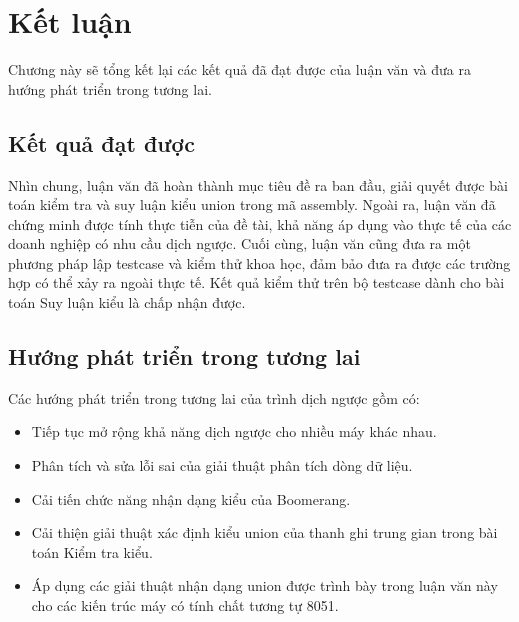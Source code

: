 \chapter{Kết luận}

Chương này sẽ tổng kết lại các kết quả đã đạt được của luận văn và đưa ra hướng phát triển trong tương lai.

\section{Kết quả đạt được}

Nhìn chung, luận văn đã hoàn thành mục tiêu đề ra ban đầu, giải quyết được bài toán kiểm tra và suy luận kiểu union trong mã assembly. Ngoài ra, luận văn đã chứng minh được tính thực tiễn của đề tài, khả năng áp dụng vào thực tế của các doanh nghiệp có nhu cầu dịch ngược. Cuối cùng, luận văn cũng đưa ra một phương pháp lập testcase và kiểm thử khoa học, đảm bảo đưa ra được các trường hợp có thể xảy ra ngoài thực tế. Kết quả kiểm thử trên bộ testcase dành cho bài toán Suy luận kiểu là chấp nhận được.

\section{Hướng phát triển trong tương lai}

Các hướng phát triển trong tương lai của trình dịch ngược gồm có:

\begin{itemize}
	\item Tiếp tục mở rộng khả năng dịch ngược cho nhiều máy khác nhau.
	\item Phân tích và sửa lỗi sai của giải thuật phân tích dòng dữ liệu.
	\item Cải tiến chức năng nhận dạng kiểu của Boomerang.
	\item Cải thiện giải thuật xác định kiểu union của thanh ghi trung gian trong bài toán Kiểm tra kiểu.
	\item Áp dụng các giải thuật nhận dạng union được trình bày trong luận văn này cho các kiến trúc máy có tính chất tương tự 8051.
\end{itemize}
